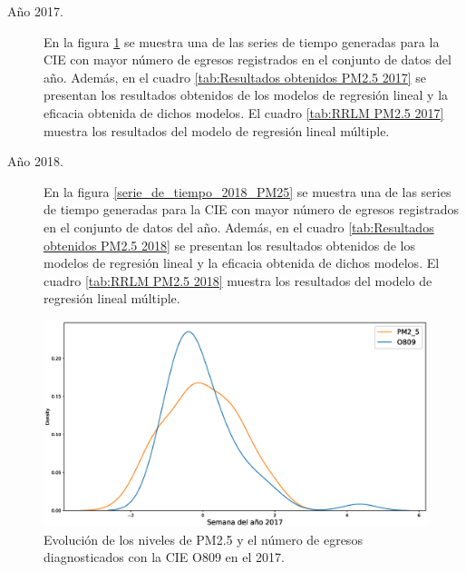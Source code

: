 \documentclass[3p,times]{elsarticle}
\begin{document}
\begin{description}
\item[Año 2017.]{En la figura \ref{serie_de_tiempo_2017_PM25} se muestra una de las series de tiempo generadas para la CIE con mayor número de egresos registrados en el conjunto de datos del año. Además, en el cuadro \ref{tab:Resultados obtenidos PM2.5 2017} se presentan los resultados obtenidos de los modelos de regresión lineal y la eficacia obtenida de dichos modelos. El cuadro \ref{tab:RRLM PM2.5 2017} muestra los resultados del modelo de regresión lineal múltiple.}

\item[Año 2018.]{En la figura \ref{serie_de_tiempo_2018_PM25} se muestra una de las series de tiempo generadas para la CIE con mayor número de egresos registrados en el conjunto de datos del año. Además, en el cuadro \ref{tab:Resultados obtenidos PM2.5 2018} se presentan los resultados obtenidos de los modelos de regresión lineal y la eficacia obtenida de dichos modelos. El cuadro \ref{tab:RRLM PM2.5 2018} muestra los resultados del modelo de regresión lineal múltiple.}
\end{description}

\begin{figure}[h!]
\setcounter{figure}{4} %
\begin{center}
   \includegraphics[width=1\textwidth]{PM2_5_O809_2017.eps}
   \end{center}
    \caption[Series de tiempo 2017 PM2.5 y O809]{Evolución de los niveles de PM2.5 y el número de egresos diagnosticados con la CIE O809 en el 2017.}
    \label{serie_de_tiempo_2017_PM25}
\end{figure}
\end{document}
